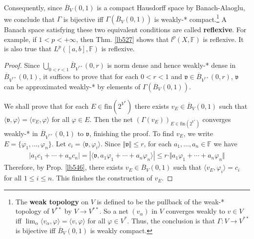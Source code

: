 \documentclass[12pt,b5paper,notitlepage]{article}
\theoremstyle{definition}
\newtheorem{rem}[df]{Remark}
\theoremstyle{plain}
\newcommand{\fk}{\mathfrak}
\newcommand{\ovl}{\overline}
\newcommand{\bk}[1]{\langle {#1}\rangle}
\newcommand{\fin}{\mathrm{fin}}
\newcommand{\Fbb}{\mathbb F}
\newcommand{\eps}{\varepsilon}
\numberwithin{equation}{section}
\begin{document}
Consequently, since $\ovl B_V(0,1)$ is a compact Hausdorff space by Banach-Alaoglu, we conclude that $\Gamma$ is bijective iff $\Gamma(\ovl B_V(0,1))$ is weakly-* compact.\footnote{The \textbf{weak topology}  on $V$ is defined to be the pullback of the weak-* topology of $V^{**}$ by $V\rightarrow V^{**}$. So a net $(v_\alpha)$ in $V$ converges weakly to $v\in V$ iff $\lim_\alpha\bk{v_\alpha,\varphi}=\bk{v,\varphi}$ for all $\varphi\in V^*$. Thus, the conclusion is that $\Gamma:V\rightarrow V^{**}$ is bijective iff $\ovl B_V(0,1)$ is weakly compact.} A Banach space satisfying these two equivalent conditions are called \textbf{reflexive}.  For example, if $1<p<+\infty$, then Thm. \ref{lb527} shows that $l^p(X,\Fbb)$ is reflexive. It is also true that $L^p([a,b],\Fbb)$ is reflexive.

\begin{proof}
Since $\bigcup_{0<r<1}\ovl B_{V^{**}}(0,r)$ is norm dense and hence weakly-* dense in  $\ovl B_{V^{**}}(0,1)$, it suffices to prove that for each $0<r<1$ and $\fk v\in\ovl B_{V^{**}}(0,r) $, $\fk v$ can be approximated weakly-* by elements of $\Gamma(\ovl B_V(0,1))$.

We shall prove that for each $E\in\fin(2^{V^*})$ there exists $v_E\in \ovl B_V(0,1)$ such that $\bk{\fk v,\varphi}=\bk{v_E,\varphi}$ for all $\varphi\in E$. Then the net $(\Gamma(v_E))_{E\in\fin(2^{V^*})}$ converges weakly-* in $\ovl B_{V^{**}}(0,1)$ to $\fk v$, finishing the proof. To find $v_E$, we write $E=\{\varphi_1,\dots,\varphi_n\}$. Let $c_i=\bk{\fk v,\varphi_i}$. Since $\Vert\fk v\Vert\leq r$, for each $a_1,\dots,a_n\in\Fbb$ we have
\begin{align*}
|a_1c_1+\cdots+a_nc_n|=|\bk{\fk v,a_1\varphi_1+\cdots+a_n\varphi_n}|\leq r\cdot\Vert a_1\varphi_1+\cdots+a_n\varphi_n\Vert
\end{align*}
Therefore, by Prop. \ref{lb546}, there exists $v_E\in \ovl B_V(0,1)$ such that $\bk{v_E,\varphi_i}=c_i$ for all $1\leq i\leq n$. This finishes the construction of $v_E$. 
\end{proof}


\begin{comment}
\begin{rem}
We will show in Exe. \ref{lb562} that if $V$ is reflexive and $U$ its closed linear subspace, then for each $v\in V$ there exists $u\in U$ minimizing $\Vert v+u\Vert$.  It follows immediately from Pb. \ref{lb547} that in Prop. \ref{lb546} one can choose $v\in V$ satisfying $\Vert v\Vert\leq M$ (but not just $\Vert v\Vert\leq M+\eps$) and \eqref{eq213}. Since $L^p(I)$ is reflexive (when $1<p<+\infty$), we thus have an explanation of why in Rem. \ref{lb552} one can choose $f_n$ satisfying $\Vert f\Vert_{L^p}\leq M$ and \eqref{eq215}.
\end{rem}
\end{comment}
\end{document}
